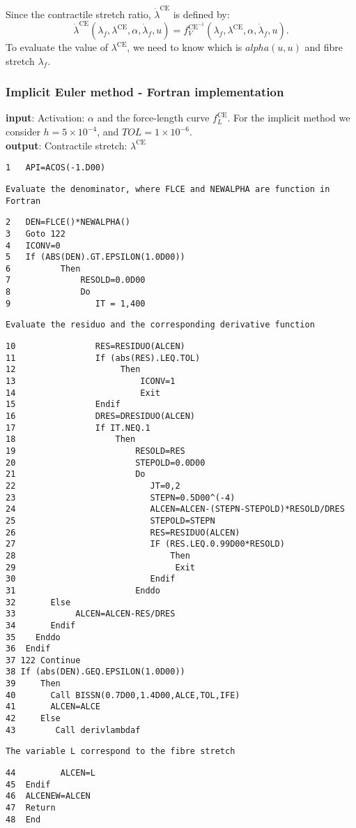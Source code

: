 \begin{flushleft}
Since the contractile stretch ratio, $\dot{\lambda}^{\mathrm{CE}}$ is defined by:
\[\dot{\lambda}^{\mathrm{CE}}(\lambda_{f},\lambda^{\mathrm{CE}},\alpha,\dot{\lambda}_{f},u)=f_{V}^{\mathrm{CE}^{-1}}\left(\lambda_{f},\lambda^{\mathrm{CE}},\alpha,\dot{\lambda}_{f},u\right).\] To evaluate the value of $\lambda^{\mathrm{CE}}$, we need to know which is $alpha(u,u)$ and fibre stretch $\lambda_f$.

\subsubsection*{\label{tab:ImplicitEuler} Implicit Euler method - Fortran implementation} 
\textbf{input}: Activation: $\alpha$ and the force-length curve $f_{L}^{\mathrm{CE}}$. For the implicit method we consider $h=5\times10^{-4}$, and $TOL=1\times10^{-6}$.\\
\textbf{output}: Contractile stretch: $\lambda^{\mathrm{CE}}$
\begin{verbatim}
1   API=ACOS(-1.D00)
\end{verbatim}
\texttt{Evaluate the denominator, where FLCE and NEWALPHA are function in Fortran}
\begin{verbatim}
2   DEN=FLCE()*NEWALPHA()
3   Goto 122
4   ICONV=0
5   If (ABS(DEN).GT.EPSILON(1.0D00))
6          Then
7              RESOLD=0.0D00
8              Do 
9                 IT = 1,400
\end{verbatim}
\texttt{Evaluate the residuo and the corresponding derivative function}
\begin{verbatim}
10                RES=RESIDUO(ALCEN)
11                If (abs(RES).LEQ.TOL)
12                     Then
13                         ICONV=1
14                         Exit
15                Endif
16                DRES=DRESIDUO(ALCEN)
17                If IT.NEQ.1
18                    Then
19                        RESOLD=RES
20                        STEPOLD=0.0D00
21                        Do
22                           JT=0,2
23                           STEPN=0.5D00^(-4)
24                           ALCEN=ALCEN-(STEPN-STEPOLD)*RESOLD/DRES
25                           STEPOLD=STEPN
26                           RES=RESIDUO(ALCEN)
27                           IF (RES.LEQ.0.99D00*RESOLD) 
28                               Then
29                                Exit
30                           Endif
31                        Enddo
32       Else
33            ALCEN=ALCEN-RES/DRES
34       Endif       
35    Enddo
36  Endif
37 122 Continue
38 If (abs(DEN).GEQ.EPSILON(1.0D00)) 
39     Then
40       Call BISSN(0.7D00,1.4D00,ALCE,TOL,IFE)
41       ALCEN=ALCE
42     Else
43        Call derivlambdaf
\end{verbatim}
\texttt{The variable L correspond to the fibre stretch}
\begin{verbatim}
44         ALCEN=L
45  Endif
46  ALCENEW=ALCEN
47  Return 
48  End
\end{verbatim}
\end{flushleft}
